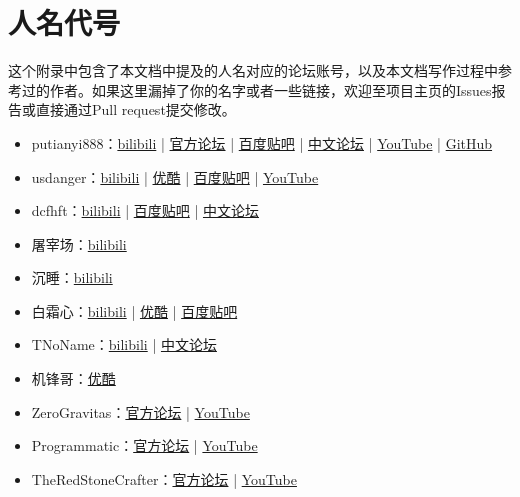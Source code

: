\chapter{人名代号}
这个附录中包含了本文档中提及的人名对应的论坛账号，以及本文档写作过程中参考过的作者。如果这里漏掉了你的名字或者一些链接，欢迎至项目主页的Issues报告或直接通过Pull request提交修改。
\begin{itemize}
\item putianyi888：\href{https://space.bilibili.com/34937101}{bilibili} | \href{https://forums.terraria.org/index.php?members/putianyi888.121300/}{官方论坛} | \href{http://tieba.baidu.com/home/main?un=putianyi888}{百度贴吧} | \href{https://www.bbstr.net/members/putianyi888.342/}{中文论坛} | \href{https://www.youtube.com/channel/UCsG1EimffDYWXBoZRekcMIA}{YouTube} | \href{https://github.com/putianyi889}{GitHub}
\item usdanger：\href{https://space.bilibili.com/34637318/}{bilibili} | \href{http://i.youku.com/u/UMTcyMDA1MTY4}{优酷} | \href{http://tieba.baidu.com/home/main?un=us_danger}{百度贴吧} | \href{https://www.youtube.com/channel/UCh_cLX4iAbM6tAIl0zu3elw}{YouTube}
\item dcfhft：\href{https://space.bilibili.com/98605295/}{bilibili} | \href{http://tieba.baidu.com/home/main?un=dcfhft}{百度贴吧} | \href{https://www.bbstr.net/members/dcfhft.135/}{中文论坛}
\item 屠宰场：\href{https://space.bilibili.com/35610991/}{bilibili}
\item 沉睡：\href{https://space.bilibili.com/22871583/}{bilibili}
\item 白霜心：\href{https://space.bilibili.com/49886444/}{bilibili} | \href{http://i.youku.com/u/UMTMyOTg1ODM4OA}{优酷} | \href{http://tieba.baidu.com/home/main?un=白霜心}{百度贴吧}
\item TNoName：\href{https://space.bilibili.com/14462041/}{bilibili} | \href{https://www.bbstr.net/members/tnoname.423/}{中文论坛}
\item 机锋哥：\href{http://i.youku.com/u/UMjg3MTI2NDcwOA}{优酷}
\item ZeroGravitas：\href{https://forums.terraria.org/index.php?members/zerogravitas.96/}{官方论坛} | \href{https://www.youtube.com/channel/UCyLQbVwYleCYzgl49dNAeOw}{YouTube}
\item Programmatic：\href{https://forums.terraria.org/index.php?members/programmatic.37545/}{官方论坛} | \href{https://www.youtube.com/channel/UCWGTYKTR5Kw3cDhyd2vIDew}{YouTube}
\item TheRedStoneCrafter：\href{https://forums.terraria.org/index.php?members/idkwhoiam129.57457/}{官方论坛} | \href{https://www.youtube.com/channel/UC9ekQoOvO3BgFQsmGdWJpCQ}{YouTube}

\end{itemize}
